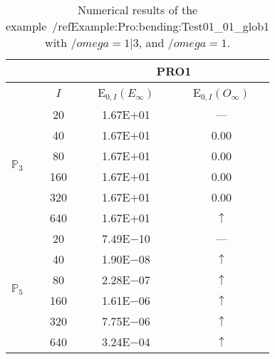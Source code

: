 \begin{table}[H]
\caption{Numerical results of the example~/ref{Example:Pro:bending:Test01_01_glob1} with $/omega=1|3$, and $/omega=1$.}
\setlength{\tabcolsep}{5pt}
\centering
\begin{tabular}{@{}l c c c@{}}
\toprule
 &  & \multicolumn{2}{c}{PRO1}\\
\midrule
 & $I$ & E$_{0,I}(E_{\infty})$ & E$_{0,I}(O_{\infty})$\\
\midrule
\multirow{6}{*}{$\mathbb{P}_{3}$}
 & 20 & 1.67E$+$01 & ---\\
 & 40 & 1.67E$+$01 & 0.00\\
 & 80 & 1.67E$+$01 & 0.00\\
 & 160 & 1.67E$+$01 & 0.00\\
 & 320 & 1.67E$+$01 & 0.00\\
 & 640 & 1.67E$+$01 & $\uparrow$\\
\midrule
\multirow{6}{*}{$\mathbb{P}_{5}$}
 & 20 & 7.49E$-$10 & ---\\
 & 40 & 1.90E$-$08 & $\uparrow$\\
 & 80 & 2.28E$-$07 & $\uparrow$\\
 & 160 & 1.61E$-$06 & $\uparrow$\\
 & 320 & 7.75E$-$06 & $\uparrow$\\
 & 640 & 3.24E$-$04 & $\uparrow$\\
\bottomrule
\end{tabular}
\label{Table:PRO:test_01_01_test10_pro1}
\end{table}
